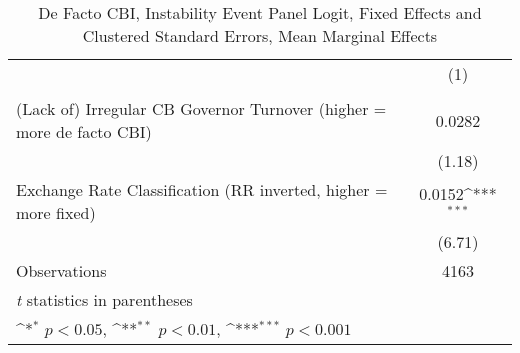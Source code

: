 \begin{table}[htbp]\centering
\def\sym#1{\ifmmode^{#1}\else\(^{#1}\)\fi}
\caption{De Facto CBI, Instability Event Panel Logit, Fixed Effects and Clustered Standard Errors, Mean Marginal Effects \label{margsJustBinInstabEventDJ}}
\begin{tabular*}{\linewidth}{@{\hskip\tabcolsep\extracolsep\fill}l*{1}{c}}
\toprule
                &\multicolumn{1}{c}{(1)}\\
                &\multicolumn{1}{c}{}\\
\midrule
(Lack of) Irregular CB Governor Turnover (higher = more de facto CBI)&   0.0282         \\
                &   (1.18)         \\
\addlinespace
Exchange Rate Classification (RR inverted, higher = more fixed)&   0.0152\sym{***}\\
                &   (6.71)         \\
\midrule
Observations    &     4163         \\
\bottomrule
\multicolumn{2}{l}{\footnotesize \textit{t} statistics in parentheses}\\
\multicolumn{2}{l}{\footnotesize \sym{*} \(p<0.05\), \sym{**} \(p<0.01\), \sym{***} \(p<0.001\)}\\
\end{tabular*}
\end{table}
